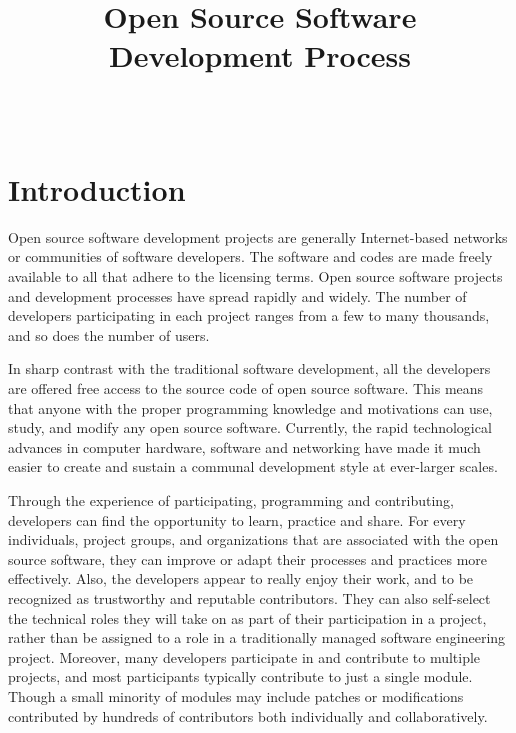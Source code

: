 \documentclass[draftclsnofoot,journal,onecolumn,12pt]{IEEEtran}
\begin{document}
\title{Open Source Software Development Process}

\author{ \\
}

\maketitle
%

\section{Introduction}

Open source software development projects are generally Internet-based networks or communities of software developers. The software and codes are made freely available to all that adhere to the licensing terms. Open source software projects and development processes have spread rapidly and widely. The number of developers participating in each project ranges from a few to many thousands, and so does the number of users.

In sharp contrast with the traditional software development, all the developers are offered free access to the source code of open source software. This means that anyone with the proper programming knowledge and motivations can use, study, and modify any open source software. Currently, the rapid technological advances in computer hardware, software and networking have made it much easier to create and sustain a communal development style at ever-larger scales.

Through the experience of participating, programming and contributing, developers can find the opportunity to learn, practice and share. For every individuals, project groups, and organizations that are associated with the open source software, they can improve or adapt their processes and practices more effectively. Also, the developers appear to really enjoy their work, and to be recognized as trustworthy and reputable contributors. They can also self-select the technical roles they will take on as part of their participation in a project, rather than be assigned to a role in a traditionally managed software engineering project. Moreover, many developers participate in and contribute to multiple projects, and most participants typically contribute to just a single module. Though a small minority of modules may include patches or modifications contributed by hundreds of contributors both individually and collaboratively.
\end{document}
